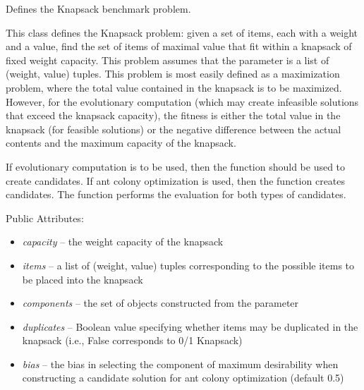 \documentclass[letterpaper,10pt,english]{sphinxmanual}
\begin{document}
\begin{fulllineitems}
\label{reference:inspyred.benchmarks.Knapsack}
Defines the Knapsack benchmark problem.

This class defines the Knapsack problem: given a set of items, each
with a weight and a value, find the set of items of maximal value
that fit within a knapsack of fixed weight capacity. This problem 
assumes that the  parameter is a list of (weight, value) 
tuples. This problem is most easily defined as a maximization problem,
where the total value contained in the knapsack is to be maximized.
However, for the evolutionary computation (which may create infeasible
solutions that exceed the knapsack capacity), the fitness is either
the total value in the knapsack (for feasible solutions) or the
negative difference between the actual contents and the maximum 
capacity of the knapsack.

If evolutionary computation is to be used, then the  
function should be used to create candidates. If ant colony 
optimization is used, then the  function creates 
candidates. The  function performs the evaluation for 
both types of candidates.

Public Attributes:
\begin{itemize}
\item {} 
\emph{capacity} -- the weight capacity of the knapsack

\item {} 
\emph{items} -- a list of (weight, value) tuples corresponding to the
possible items to be placed into the knapsack

\item {} 
\emph{components} -- the set of  objects constructed
from the  parameter

\item {} 
\emph{duplicates} -- Boolean value specifying whether items may be 
duplicated in the knapsack (i.e., False corresponds to 0/1 Knapsack)

\item {} 
\emph{bias} -- the bias in selecting the component of maximum desirability
when constructing a candidate solution for ant colony optimization 
(default 0.5)

\end{itemize}


\end{fulllineitems}
\end{document}
